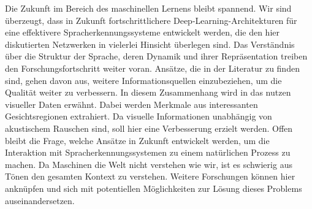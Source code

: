 Die Zukunft im Bereich des maschinellen Lernens bleibt spannend. Wir sind überzeugt, dass in Zukunft fortschrittlichere Deep-Learning-Architekturen für eine effektivere Spracherkennungssysteme entwickelt werden, die den hier diskutierten Netzwerken in vielerlei Hinsicht überlegen sind. Das Verständnis über die Struktur der Sprache, deren Dynamik und ihrer Repräsentation treiben den Forschungsfortschritt weiter voran. Ansätze, die in der Literatur zu finden sind, gehen davon aus, weitere Informationsquellen einzubeziehen, um die Qualität weiter zu verbessern. In diesem Zusammenhang wird in {\cite{Yu.2014}} das nutzen visueller Daten erwähnt. Dabei werden Merkmale aus interessanten Gesichtsregionen extrahiert. Da visuelle Informationen unabhängig von akustischem Rauschen sind, soll hier eine Verbesserung erzielt werden. Offen bleibt die Frage, welche Ansätze in Zukunft entwickelt werden, um die Interaktion mit Spracherkennungssystemen zu einem natürlichen Prozess zu machen. Da Maschinen die Welt nicht verstehen wie wir, ist es schwierig aus Tönen den gesamten Kontext zu verstehen. Weitere Forschungen können hier anknüpfen und sich mit potentiellen Möglichkeiten zur Lösung dieses Problems auseinandersetzen.  

\ifCLASSOPTIONcaptionsoff
  \newpage
\fi